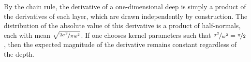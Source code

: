 By the chain rule, the derivative of a one-dimensional deep \gp{} is simply a product of the derivatives of each layer, which are drawn independently by construction.
The distribution of the absolute value of this derivative is a product of half-normals, each with mean $\sqrt{\nicefrac{2 \sigma^2}{\pi w^2}}$.
%
%
If one chooses kernel parameters such that ${\nicefrac{\sigma^2}{w^2} = \nicefrac{\pi}{2}}$, then the expected magnitude of the derivative remains constant regardless of the depth.


